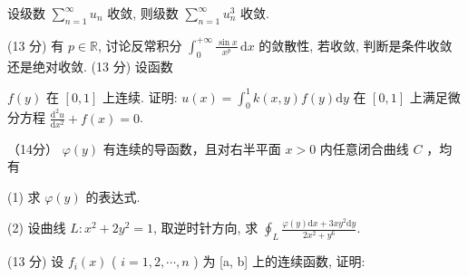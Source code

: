 \nopagebreak[4]
设级数 $\sum_{n=1}^{\infty} u_n$ 收敛, 则级数 $\sum_{n=1}^{\infty} u_n^3$ 收敛.\par
\par{}
\par{}
(13 分) 有 $p \in \mathbb{R}$, 讨论反常积分 $\int_{0}^{+\infty} \frac{\sin x}{x^p} \, \mathrm{d}x$ 的敛散性, 若收敛, 判断是条件收敛还是绝对收敛.
(13 分) 设函数\par
\nopagebreak[4]
$f(y)$ 在 $[0,1]$ 上连续. 证明: $u(x) = \int_{0}^{1} k(x,y)f(y)\mathrm{d}y$ 在 $[0,1]$ 上满足微分方程 $\frac{\mathrm{d}^2 u}{\mathrm{d}x^2} + f(x) = 0$.\par
\par{}
\par{}
（14分） $\varphi (y)$ 有连续的导函数，且对右半平面 $x > 0$ 内任意闭合曲线 $C$ ，均有\par
\nopagebreak[4]
(1) 求  $\varphi(y)$  的表达式.\par
(2) 设曲线 $L: x^2 + 2y^2 = 1$, 取逆时针方向, 求 $\oint_{L} \frac{\varphi(y) \mathrm{d}x + 3xy^2 \mathrm{d}y}{2x^2 + y^6}$.\par
\par{}
\par{}
(13 分) 设  $f_{i}(x)$  ( $i = 1, 2, \cdots, n$ ) 为 [a, b] 上的连续函数, 证明:\par
